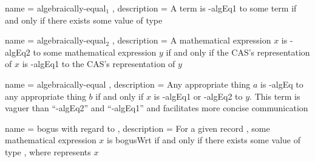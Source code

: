 \documentclass{report}
\begin{document}
  { name = algebraically-equal\({}_1\)
  , description = A term  is -\gls{algEq1} to some term  if and only if there exists some value of type    
  }

  { name = algebraically-equal\({}_2\)
  , description = A mathematical expression \(x\) is -\gls{algEq2} to some mathematical expression \(y\) if and only if the  CAS's representation of \(x\) is -\gls{algEq1} to the  CAS's representation of \(y\)
  }

  { name = algebraically-equal
  , description = Any appropriate thing \(a\) is -\gls{algEq} to any appropriate thing \(b\) if and only if \(x\) is -\gls{algEq1} or -\gls{algEq2} to \(y\).  This term is vaguer than ``-\gls{algEq2}'' and ``-\gls{algEq1}'' and facilitates more concise communication
  }

  { name = bogus with regard to
  , description = {For a given  record , some mathematical expression \(x\) is \gls{bogusWrt}  if and only if there exists some value of type   , where  represents \(x\)}
  }

\clearpage{}

\printglossary{}
\end{document}
